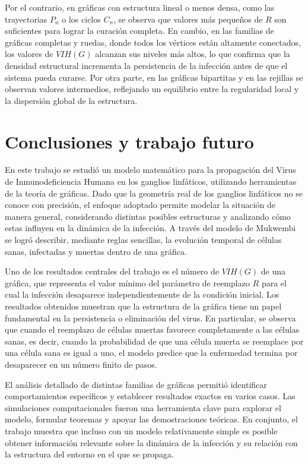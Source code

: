 \documentclass[12pt,titlepage,twoside,openright]{book}
\begin{document}
Por el contrario, en gr\'aficas con estructura lineal o menos densa, como las trayectorias $P_n$ o los ciclos $C_n$, se observa que valores m\'as peque\~nos de $R$ son suficientes para lograr la curaci\'on completa. En cambio, en las familias de gr\'aficas completas y ruedas, donde todos los v\'ertices est\'an altamente conectados, los valores de $VIH(G)$ alcanzan sus niveles m\'as altos, lo que confirma que la densidad estructural incrementa la persistencia de la infecci\'on antes de que el sistema pueda curarse. Por otra parte, en las gr\'aficas bipartitas y en las rejillas se observan valores intermedios, reflejando un equilibrio entre la regularidad local y la dispersi\'on global de la estructura.

\chapter{Conclusiones y trabajo futuro}

En este trabajo se estudi\'o un modelo matem\'atico para la propagaci\'on del Virus de Inmunodeficiencia Humana en los ganglios linf\'aticos, utilizando herramientas de la teor\'ia de gr\'aficas. Dado que la geometr\'ia real de los ganglios linf\'aticos no se conoce con precisi\'on, el enfoque adoptado permite modelar la situaci\'on de manera general, considerando distintas posibles estructuras y analizando c\'omo estas influyen en la din\'amica de la infecci\'on. A trav\'es del modelo de Mukwembi se logr\'o describir, mediante reglas sencillas, la evoluci\'on temporal de c\'elulas sanas, infectadas y muertas dentro de una gr\'afica.

Uno de los resultados centrales del trabajo es el n\'umero de $VIH(G)$ de una gr\'afica, que representa el valor m\'inimo del par\'ametro de reemplazo $R$ para el cual la infecci\'on desaparece independientemente de la condici\'on inicial. Los resultados obtenidos muestran que la estructura de la gr\'afica tiene un papel fundamental en la persistencia o eliminaci\'on del virus. En particular, se observa que cuando el reemplazo de c\'elulas muertas favorece completamente a las c\'elulas sanas, es decir, cuando la probabilidad de que una c\'elula muerta se reemplace por una c\'elula sana es igual a uno, el modelo predice que la enfermedad termina por desaparecer en un n\'umero finito de pasos.

El an\'alisis detallado de distintas familias de gr\'aficas permiti\'o identificar comportamientos espec\'ificos y establecer resultados exactos en varios casos. Las simulaciones computacionales fueron una herramienta clave para explorar el modelo, formular teoremas y apoyar las demostraciones te\'oricas. En conjunto, el trabajo muestra que incluso con un modelo relativamente simple es posible obtener informaci\'on relevante sobre la din\'amica de la infecci\'on y su relaci\'on con la estructura del entorno en el que se propaga.
\end{document}
